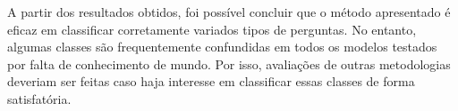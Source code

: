 A partir dos resultados obtidos, foi possível concluir que o método apresentado é eficaz em classificar corretamente variados tipos de perguntas. No entanto, algumas classes são frequentemente confundidas em todos os modelos testados por falta de conhecimento de mundo. Por isso, avaliações de outras metodologias deveriam ser feitas caso haja interesse em classificar essas classes de forma satisfatória.








